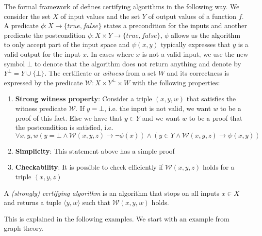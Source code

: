 The formal framework of \cite{CertAlg} defines certifying algorithms in the following way. We consider the set $X$ of input values and the set $Y$ of output values of a function $f$. A predicate $\phi: X \to \{true, false\}$ states a precondition for the inputs and another predicate the postcondition $\psi: X \times Y \to \{true, false\}$, $\phi$ allows us the algorithm to only accept part of the input space and $\psi(x,y)$ typically expresses that $y$ is a valid output for the input $x$. In cases where $x$ is not a valid input, we use the new symbol $\bot$ to denote that the algorithm does not return anything and denote by $Y^\bot = Y \cup \{\bot\}$.
The certificate or \textit{witness} from a set $W$ and its correctness is expressed by the predicate $\mathcal{W}: X \times Y^\bot \times W$ with the following properties:

\begin{enumerate}
    \item \textbf{Strong witness property}: Consider a triple $(x,y,w)$ that satisfies the witness predicate $\mathcal{W}$. If $y=\bot$, i.e. the input is not valid, we want $w$ to be a proof of this fact. Else we have that $y\in Y$ and we want $w$ to be a proof that the postcondition is satisfied, i.e.
    \[ \forall x,y,w (y = \bot \land \mathcal{W}(x,y,z) \rightarrow \neg \phi(x)) \land (y \in Y \land \mathcal{W}(x,y,z) \rightarrow \psi(x,y)) \]
    \item \textbf{Simplicity}: This statement above has a simple proof
    \item \textbf{Checkability}: It is possible to check efficiently if $\mathcal{W}(x,y,z)$ holds for a triple $(x,y,z)$
\end{enumerate}

A \textit{(strongly) certifying algorithm} is an algorithm that stops on all inputs $x \in X$ and returns a tuple $\langle y, w\rangle$ such that $\mathcal{W}(x,y,w)$ holds.

This is explained in the following examples. We start with an example from graph theory.

